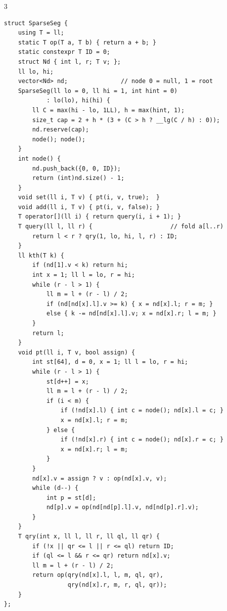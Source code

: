\documentclass[9pt,a4paper]{extarticle}
\begin{document}
\begin{multicols*}{3}
\begin{lstlisting}
struct SparseSeg {
    using T = ll;
    static T op(T a, T b) { return a + b; }
    static constexpr T ID = 0;
    struct Nd { int l, r; T v; };
    ll lo, hi;
    vector<Nd> nd;               // node 0 = null, 1 = root
    SparseSeg(ll lo = 0, ll hi = 1, int hint = 0)
            : lo(lo), hi(hi) {
        ll C = max(hi - lo, 1LL), h = max(hint, 1);
        size_t cap = 2 + h * (3 + (C > h ? __lg(C / h) : 0));
        nd.reserve(cap);
        node(); node();
    }
    int node() {
        nd.push_back({0, 0, ID});
        return (int)nd.size() - 1;
    }
    void set(ll i, T v) { pt(i, v, true);  }
    void add(ll i, T v) { pt(i, v, false); }
    T operator[](ll i) { return query(i, i + 1); }
    T query(ll l, ll r) {                      // fold a[l..r)
        return l < r ? qry(1, lo, hi, l, r) : ID;
    }
    ll kth(T k) {
        if (nd[1].v < k) return hi;
        int x = 1; ll l = lo, r = hi;
        while (r - l > 1) {
            ll m = l + (r - l) / 2;
            if (nd[nd[x].l].v >= k) { x = nd[x].l; r = m; }
            else { k -= nd[nd[x].l].v; x = nd[x].r; l = m; }
        }
        return l;
    }
    void pt(ll i, T v, bool assign) {
        int st[64], d = 0, x = 1; ll l = lo, r = hi;
        while (r - l > 1) {
            st[d++] = x;
            ll m = l + (r - l) / 2;
            if (i < m) {
                if (!nd[x].l) { int c = node(); nd[x].l = c; }
                x = nd[x].l; r = m;
            } else {
                if (!nd[x].r) { int c = node(); nd[x].r = c; }
                x = nd[x].r; l = m;
            }
        }
        nd[x].v = assign ? v : op(nd[x].v, v);
        while (d--) {
            int p = st[d];
            nd[p].v = op(nd[nd[p].l].v, nd[nd[p].r].v);
        }
    }
    T qry(int x, ll l, ll r, ll ql, ll qr) {
        if (!x || qr <= l || r <= ql) return ID;
        if (ql <= l && r <= qr) return nd[x].v;
        ll m = l + (r - l) / 2;
        return op(qry(nd[x].l, l, m, ql, qr),
                  qry(nd[x].r, m, r, ql, qr));
    }
};
\end{lstlisting}


\end{multicols*}
\end{document}
